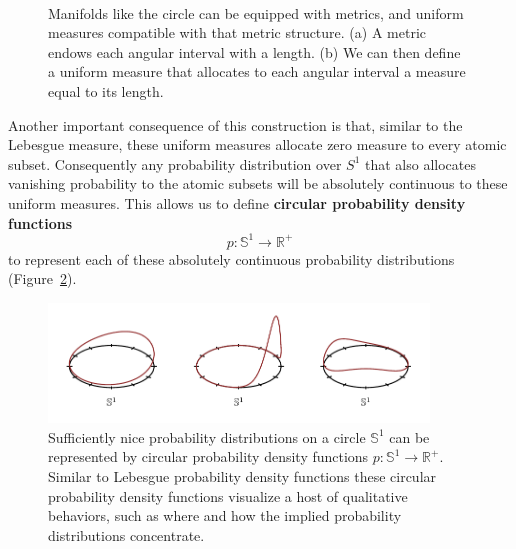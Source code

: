 \documentclass[
  letterpaper,
  DIV=11,
  numbers=noendperiod]{scrartcl}
\begin{document}
\begin{figure}
\begin{minipage}[t]{0.35\linewidth}
{{}

}

\subcaption{\label{fig-circle-measure}}
\end{minipage}%
%
\begin{minipage}[t]{0.15\linewidth}

{\centering 

~

}

\end{minipage}%

\caption{\label{fig-circle}Manifolds like the circle can be equipped
with metrics, and uniform measures compatible with that metric
structure. (a) A metric endows each angular interval with a length. (b)
We can then define a uniform measure that allocates to each angular
interval a measure equal to its length.}

\end{figure}

Another important consequence of this construction is that, similar to
the Lebesgue measure, these uniform measures allocate zero measure to
every atomic subset. Consequently any probability distribution over
\(S^{1}\) that also allocates vanishing probability to the atomic
subsets will be absolutely continuous to these uniform measures. This
allows us to define \textbf{circular probability density functions} \[
p : \mathbb{S}^{1} \rightarrow \mathbb{R}^{+}
\] to represent each of these absolutely continuous probability
distributions (Figure~\ref{fig-circular-density-functions}).

\begin{figure}

{\centering \includegraphics[width=0.9\textwidth,height=\textheight]{figures/circular_density_functions/circular_density_functions.pdf}

}

\caption{\label{fig-circular-density-functions}Sufficiently nice
probability distributions on a circle \(\mathbb{S}^{1}\) can be
represented by circular probability density functions
\(p : \mathbb{S}^{1} \rightarrow \mathbb{R}^{+}\). Similar to Lebesgue
probability density functions these circular probability density
functions visualize a host of qualitative behaviors, such as where and
how the implied probability distributions concentrate.}

\end{figure}
\end{document}
